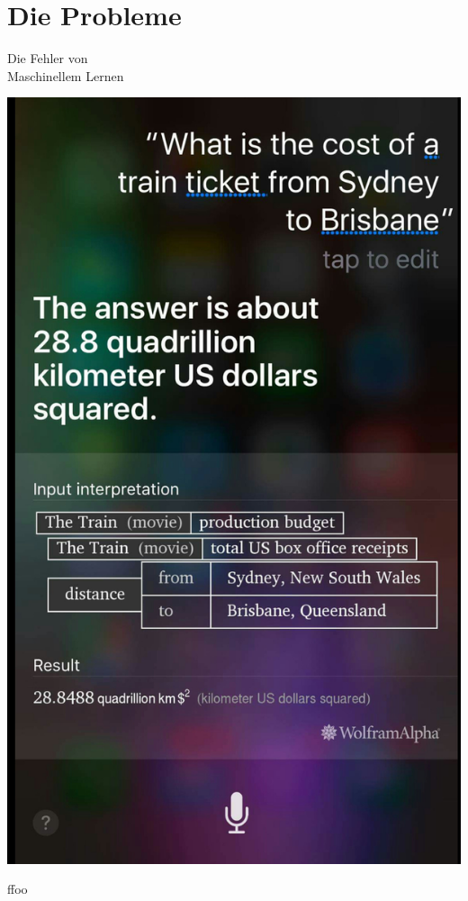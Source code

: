 \documentclass[aspectratio=43]{beamer}
\begin{document}

\section{Die Probleme}

\begin{frame}
\begin{center}
\Large
Die Fehler von\\Maschinellem Lernen
\end{center}
\end{frame}

\begin{frame}

\begin{multicols}{2}

\includegraphics[scale=0.1]{images/sirifail.jpg} 

\columnbreak

ffoo
\end{multicols}
\end{frame}
\end{document}
